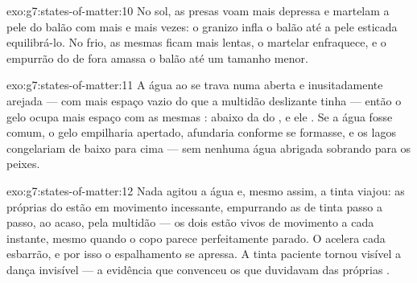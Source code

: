 \begin{solution}{exo:g7:states-of-matter:10}
No sol, as  presas voam mais depressa e martelam a pele do
balão com mais  e mais vezes: o granizo infla o balão até a pele
esticada equilibrá-lo. No frio, as mesmas  ficam mais
lentas, o martelar enfraquece, e o empurrão do  de fora amassa o
balão até um tamanho menor.
\end{solution}

\begin{solution}{exo:g7:states-of-matter:11}
A água ao  se trava numa  aberta e inusitadamente
arejada --- com mais espaço vazio do que a multidão deslizante tinha
--- então o gelo ocupa mais espaço com as mesmas : 
abaixo da do , e ele . Se a água fosse comum, o gelo
empilharia apertado, afundaria conforme se formasse, e os lagos
congelariam de baixo para cima --- sem nenhuma água abrigada sobrando
para os peixes.
\end{solution}

\begin{solution}{exo:g7:states-of-matter:12}
Nada agitou a água e, mesmo assim, a tinta viajou: as próprias
 do  estão em movimento incessante, empurrando as
 de tinta passo a passo, ao acaso, pela multidão --- os dois
 estão vivos de movimento a cada instante, mesmo quando o
copo parece perfeitamente parado. O  acelera cada esbarrão, e
por isso o espalhamento se apressa. A tinta paciente tornou visível a
dança invisível --- a evidência que convenceu os que duvidavam das
próprias .
\end{solution}

